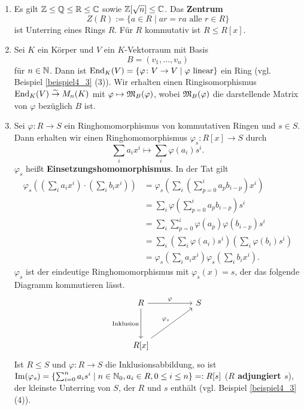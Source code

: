 \begin{beispiel}\label{beispiel4_6}
	\begin{enumerate}[label=(\arabic*)]
		\item Es gilt $\mathbb{Z} \leq \mathbb{Q} \leq \mathbb{R} \leq \mathbb{C}$ sowie $\mathbb{Z}[\sqrt{n}] \leq \mathbb{C}$. Das \textbf{Zentrum} 
		\[Z(R) := \{a \in R \mid ar=ra \text{ alle } r \in R\}\]
		ist Unterring eines Rings $R$. Für $R$ kommutativ ist $R \leq R[x]$.
		\item Sei $K$ ein Körper und $V$ ein $K$-Vektorraum mit Basis
		\[B = (v_1, \dots, v_n)\]
		für $n \in \mathbb{N}$. Dann ist $\mathrm{End}_K(V) = \{\varphi\colon V \to V \mid \varphi \text{ linear}\}$ ein Ring (vgl. Beispiel \ref{beispiel4_3} (3)). Wir erhalten einen Ringisomorphismus $\mathrm{End}_K(V) \overset{\sim}{\to} M_n(K)$ mit $\varphi \mapsto \mathfrak{M}_B(\varphi)$, wobei $\mathfrak{M}_B(\varphi)$ die darstellende Matrix von $\varphi$ bezüglich $B$ ist.
		\item Sei $\varphi \colon R \to S$ ein Ringhomomorphismus von kommutativen Ringen und $s \in S$. Dann erhalten wir einen Ringhomomorphismus $\varphi_s \colon R[x] \to S$ durch 
		\[\sum_i a_i x^i \mapsto \sum_i \varphi(a_i)s^i.\]
		$\varphi_s$ heißt \textbf{Einsetzungshomomorphismus}. In der Tat gilt 
		\begin{align*}
			\varphi_s\left( \left(\sum_i a_i x^i\right) \cdot \left(\sum_i b_i x^i\right)\right) &= \varphi_s\left(\sum_i \left(\sum_{p=0}^i a_p b_{i-p}\right)x^i\right)\\
			&= \sum_i \varphi\left(\sum_{p=0}^i a_p b_{i-p}\right) s^i\\
			&= \sum_i \sum_{p=0}^i \varphi(a_p)\varphi(b_{i-p}) s^i\\
			&= \sum_i \left(\sum_i \varphi(a_i) s^i\right) \left(\sum_{i} \varphi(b_i) s^i\right)\\
			&= \varphi_s\left(\sum_i a_ix^i\right) \varphi_s\left(\sum_i b_ix^i\right).
		\end{align*}
		$\varphi_s$ ist der eindeutige Ringhomomorphismus mit $\varphi_s(x) = s$, der das folgende Diagramm kommutieren lässt.
		\[
		\begin{tikzcd}[column sep=huge, row sep=huge]
			R \arrow{r}{\varphi} \arrow[swap]{d}{\text{Inklusion}} & S \\
			R[x] \arrow{ur}{\varphi_s}
		\end{tikzcd}
		\]
		Ist $R \leq S$ und $\varphi \colon R \to S$ die Inklusionsabbildung, so ist  $\mathrm{Im}(\varphi_s) = \{\sum_{i=0}^n a_i s^i \mid n \in \mathbb{N}_0, a_i \in R, 0 \leq i \leq n\} =: R[s]$ (\glqq\textbf{$R$ adjungiert $s$}\grqq), der kleinste Unterring von $S$, der $R$ und $s$ enthält (vgl. Beispiel \ref{beispiel4_3} (4)). 
		\vspace{0.5cm}
		

\end{enumerate}
\end{beispiel}

